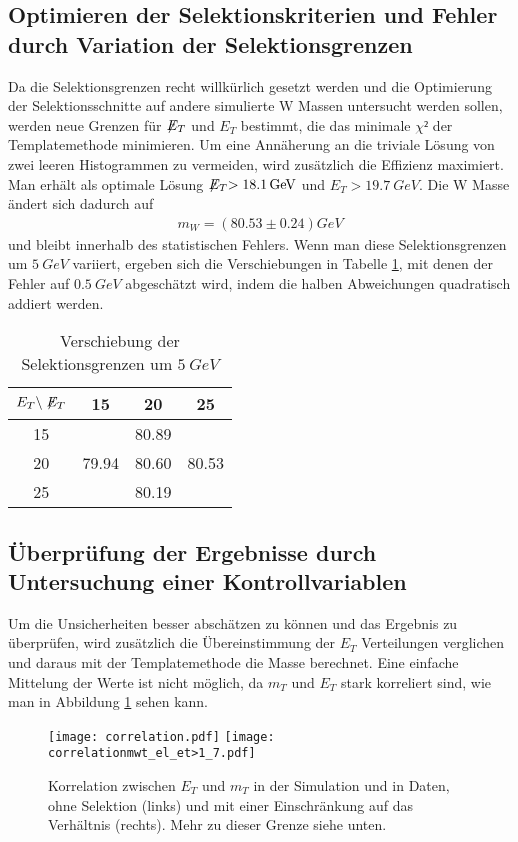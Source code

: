 \documentclass[a4paper,12pt]{article}
\newcommand{\met}{\ensuremath{\not\mathrel{E}}_T}
\begin{document}
\subsection{Optimieren der Selektionskriterien und Fehler durch Variation der Selektionsgrenzen}
Da die Selektionsgrenzen recht willkürlich gesetzt werden und die Optimierung der Selektionsschnitte
auf andere simulierte W Massen untersucht werden sollen, werden neue Grenzen für $\met$ und $E_{T}$
bestimmt, die das minimale $χ²$ der Templatemethode minimieren.
Um eine Annäherung an die triviale Lösung von zwei leeren Histogrammen zu vermeiden, wird zusätzlich
die Effizienz maximiert. Man erhält als optimale Lösung $\met> \SI{18.1}{GeV}$ und $E_{T} >
\SI{19.7}{GeV}$. Die W Masse ändert sich dadurch auf
\begin{align*}
	m_W = ( 80.53 ± 0.24 ) \si{GeV}
\end{align*}
und bleibt innerhalb des statistischen Fehlers. Wenn man diese Selektionsgrenzen um $\SI{5}{GeV}$
variiert, ergeben sich die Verschiebungen in Tabelle \ref{tab:variation}, mit denen der Fehler
auf $\SI{0.5}{GeV}$ abgeschätzt wird, indem die halben Abweichungen quadratisch addiert werden.
\begin{table}
	\centering
	\begin{tabular}{c| c c c}
		$E_{T} \backslash \met$ & 15 & 20 & 25 \\
		\hline
		15 &  & 80.89 & \\
		20 & 79.94 & 80.60 & 80.53 \\
		25 &  & 80.19 &
	\end{tabular}
	\caption{Verschiebung der Selektionsgrenzen um $\SI{5}{GeV}$}
	\label{tab:variation}
\end{table}

\subsection{Überprüfung der Ergebnisse durch Untersuchung einer Kontrollvariablen}
Um die Unsicherheiten besser abschätzen zu können und das Ergebnis zu überprüfen, wird zusätzlich
die Übereinstimmung der $E_T$ Verteilungen verglichen und daraus mit der Templatemethode die Masse
berechnet. Eine einfache Mittelung der Werte ist nicht möglich, da $m_T$ und $E_T$ stark korreliert
sind, wie man in Abbildung \ref{fig:correlation} sehen kann.
\begin{figure}[htb]
	\centering
	\texttt{[image: correlation.pdf]}
	\texttt{[image: correlationmwt\_el\_et>1\_7.pdf]}
	\caption{Korrelation zwischen $E_T$ und $m_T$ in der Simulation und in Daten, ohne Selektion
	(links) und mit einer Einschränkung auf das Verhältnis (rechts). Mehr zu dieser Grenze siehe
	unten.}
	\label{fig:correlation}
\end{figure}
\end{document}
